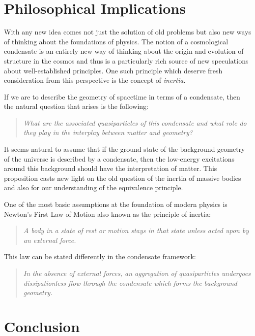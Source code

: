 \documentclass[11pt,english,rmp]{revtex4}
\begin{document}
\section{Philosophical Implications}

With any new idea comes not just the solution of old problems but also new ways of thinking about the foundations of physics. The notion of a cosmological condensate is an entirely new way of thinking about the origin and evolution of structure in the cosmos and thus is a particularly rich source of new speculations about well-established principles. One such principle which deserve fresh consideration from this perspective is the concept of \emph{inertia}.

If we are to describe the geometry of spacetime in terms of a condensate, then the natural question that arises is the following:

\begin{quote}
\emph{What are the associated quasiparticles of this condensate and what role do they play in the interplay between matter and geometry?}
\end{quote}

It seems natural to assume that if the ground state of the background geometry of the universe is described by a condensate, then the low-energy excitations around this background should have the interpretation of matter. This proposition casts new light on the old question of the inertia of massive bodies and also for our understanding of the equivalence principle.

One of the most basic assumptions at the foundation of modern physics is Newton's First Law of Motion also known as the principle of inertia:

\begin{quote}
\emph{A body in a state of rest or motion stays in that state unless acted upon by an external force.}
\end{quote}

This law can be stated differently in the condensate framework:

\begin{quote}
\emph{In the absence of external forces, an aggregation of quasiparticles undergoes dissipationless flow through the condensate which forms the background geometry.} 
\end{quote}

\section{Conclusion}
\end{document}
